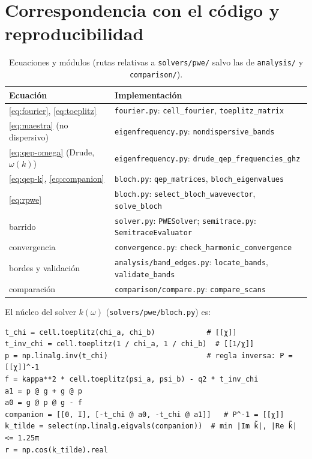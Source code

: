 \documentclass[11pt,a4paper]{article}
\newcommand{\code}[1]{\texttt{#1}}
\begin{document}
\section{Correspondencia con el código y reproducibilidad}\label{app:codigo}

\begin{table}[H]
\centering
\caption{Ecuaciones y módulos (rutas relativas a \code{solvers/pwe/} salvo las de \code{analysis/} y \code{comparison/}).}
\begin{tabular}{ll}
\toprule
Ecuación & Implementación \\
\midrule
\eqref{eq:fourier}, \eqref{eq:toeplitz} & \code{fourier.py}: \code{cell\_fourier}, \code{toeplitz\_matrix} \\
\eqref{eq:maestra} (no dispersivo) & \code{eigenfrequency.py}: \code{nondispersive\_bands} \\
\eqref{eq:qep-omega} (Drude, $\omega(k)$) & \code{eigenfrequency.py}: \code{drude\_qep\_frequencies\_ghz} \\
\eqref{eq:qep-k}, \eqref{eq:companion} & \code{bloch.py}: \code{qep\_matrices}, \code{bloch\_eigenvalues} \\
\eqref{eq:rpwe} & \code{bloch.py}: \code{select\_bloch\_wavevector}, \code{solve\_bloch} \\
barrido & \code{solver.py}: \code{PWESolver}; \code{semitrace.py}: \code{SemitraceEvaluator} \\
convergencia & \code{convergence.py}: \code{check\_harmonic\_convergence} \\
bordes y validación & \code{analysis/band\_edges.py}: \code{locate\_bands}, \code{validate\_bands} \\
comparación & \code{comparison/compare.py}: \code{compare\_scans} \\
\bottomrule
\end{tabular}
\end{table}

El núcleo del solver $k(\omega)$ (\code{solvers/pwe/bloch.py}) es:
\begin{lstlisting}
t_chi = cell.toeplitz(chi_a, chi_b)            # [[χ]]
t_inv_chi = cell.toeplitz(1 / chi_a, 1 / chi_b)  # [[1/χ]]
p = np.linalg.inv(t_chi)                       # regla inversa: P = [[χ]]^-1
f = kappa**2 * cell.toeplitz(psi_a, psi_b) - q2 * t_inv_chi
a1 = p @ g + g @ p
a0 = g @ p @ g - f
companion = [[0, I], [-t_chi @ a0, -t_chi @ a1]]   # P^-1 = [[χ]]
k_tilde = select(np.linalg.eigvals(companion))  # min |Im k̃|, |Re k̃| <= 1.25π
r = np.cos(k_tilde).real
\end{lstlisting}
\end{document}

